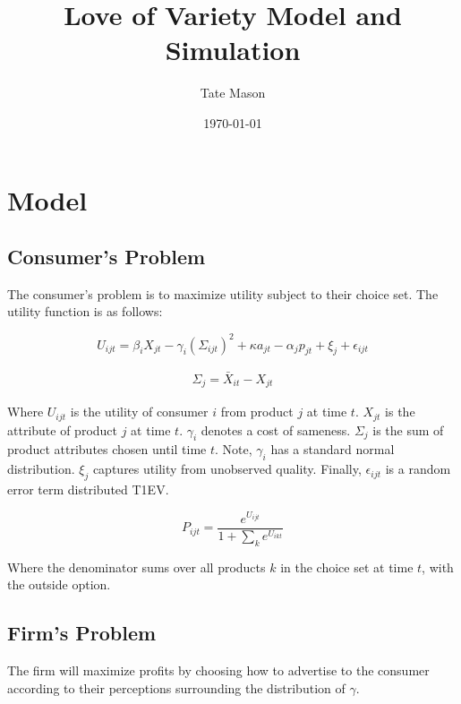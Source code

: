 \documentclass[11pt]{article}
\title{Love of Variety Model and Simulation}
\author{Tate Mason}
\date{\today}
\theoremstyle{definition}
\theoremstyle{remark}
\begin{document}
\maketitle
\thispagestyle{empty}


\newpage
\setcounter{page}{1}

\section{Model}

\subsection{Consumer's Problem}
The consumer's problem is to maximize utility subject to their choice set. The utility function is as follows:

\begin{equation}
  U_{ijt} = \beta_i X_{jt} - \gamma_{i}(\Sigma_{ijt})^2 + \kappa a_{jt} - \alpha_jp_{jt} + \xi_j + \epsilon_{ijt}
\end{equation}

\begin{gather*}
  \Sigma_j = \bar{X}_{it}-X_{jt}
\end{gather*}

Where $U_{ijt}$ is the utility of consumer $i$ from product $j$ at time $t$. $X_{jt}$ is the attribute of product $j$ at time $t$.  $\gamma_{i}$ denotes 
a cost of sameness. $\Sigma_j$ is the sum of product attributes chosen until time $t$. Note, $\gamma_i$ has a standard normal distribution. 
$\xi_j$ captures utility from unobserved quality. Finally, $\epsilon_{ijt}$ is a  random error term distributed T1EV.

\begin{equation}
  P_{ijt} = \frac{e^{U_{ijt}}}{1 + \sum_{k} e^{U_{ikt}}}
\end{equation}

Where the denominator sums over all products $k$ in the choice set at time $t$, with the outside option.

\subsection{Firm's Problem}
The firm will maximize profits by choosing how to advertise to the consumer according to their perceptions surrounding the distribution of $\gamma$.
\end{document}
